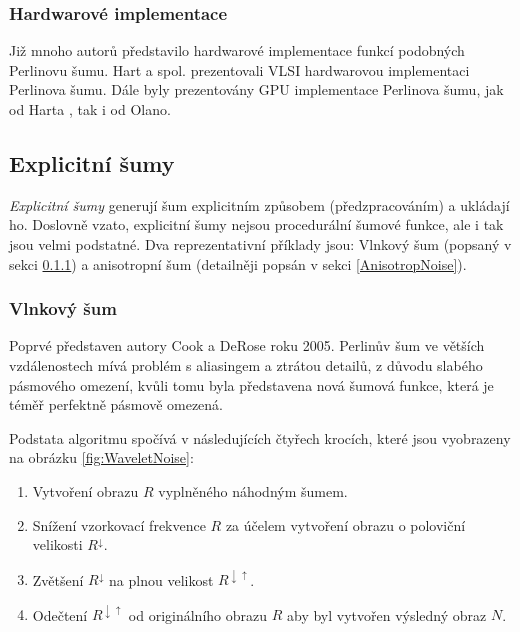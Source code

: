 \subsubsection{Hardwarové implementace}
Již mnoho autorů představilo hardwarové implementace funkcí podobných Perlinovu šumu. Hart a spol. \cite{hart1999antialiased} prezentovali VLSI hardwarovou implementaci Perlinova šumu. Dále byly prezentovány GPU implementace Perlinova šumu, jak od Harta \cite{hart01}, tak i od Olano. \cite{ola05}

\subsection{Explicitní šumy}
\label{ExplicitNoises}
\textit{Explicitní šumy} generují šum explicitním způsobem (předzpracováním) a ukládají ho. Doslovně vzato, explicitní šumy nejsou procedurální šumové funkce, ale i tak jsou velmi podstatné. Dva reprezentativní příklady jsou: Vlnkový šum (popsaný v sekci \ref{WaveletNoise}) a anisotropní šum (detailněji popsán v sekci \ref{AnisotropNoise}).~\cite{Lagae10}

\subsubsection{Vlnkový šum}
\label{WaveletNoise}
Poprvé představen autory Cook a DeRose roku 2005. \cite{Cook05} Perlinův šum ve větších vzdálenostech mívá problém s aliasingem a ztrátou detailů, z důvodu slabého pásmového omezení, kvůli tomu byla představena nová šumová funkce, která je téměř perfektně pásmově omezená.

Podstata algoritmu spočívá v následujících čtyřech krocích, které jsou vyobrazeny na obrázku \ref{fig:WaveletNoise}:

\begin{enumerate}
	\item Vytvoření obrazu $R$ vyplněného náhodným šumem.
	\item Snížení vzorkovací frekvence $R$ za účelem vytvoření obrazu o poloviční velikosti $R^\downarrow$.
	\item Zvětšení $R^\downarrow$ na plnou velikost $R^{\downarrow\uparrow}$.
	\item Odečtení $R^{\downarrow\uparrow}$ od originálního obrazu $R$ aby byl vytvořen výsledný obraz $N$.
\end{enumerate}

